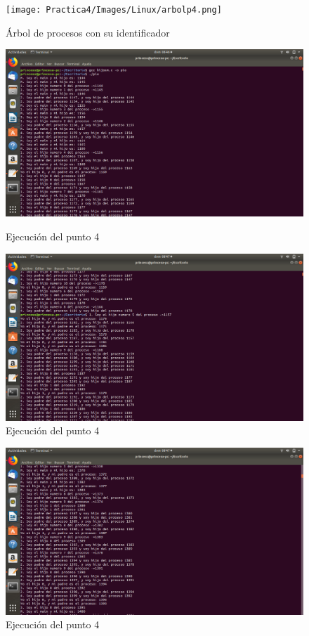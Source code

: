 \documentclass[12pt]{article}
\begin{document}
\begin{itemize}
                \begin{figure}[h!]
                  \centering
                    \texttt{[image: Practica4/Images/Linux/arbolp4.png]} 
                    \caption{Árbol de procesos con su identificador}
                \end{figure}
               \newpage
                \begin{figure}[h!]
                \centering
                    \includegraphics[width=\textwidth]{Practica4/Images/Linux/4_1.png}
                    \caption{Ejecución del punto 4}
                     \includegraphics[width=\textwidth]{Practica4/Images/Linux/4_2.png}
                    \caption{Ejecución del punto 4}
                \end{figure}
\newpage
                \begin{figure}[h!]
                \centering
                    \includegraphics[width=\textwidth]{Practica4/Images/Linux/4_3.png}
                    \caption{Ejecución del punto 4}


\end{figure}
\end{itemize}
\end{document}
